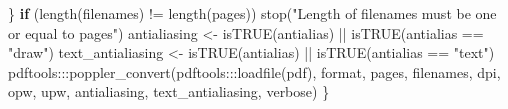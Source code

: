 \documentclass[
]{article}
\newenvironment{Shaded}{\begin{snugshade}}{\end{snugshade}}
\newcommand{\ControlFlowTok}[1]{\textcolor[rgb]{0.13,0.29,0.53}{\textbf{#1}}}
\newcommand{\FunctionTok}[1]{\textcolor[rgb]{0.00,0.00,0.00}{#1}}
\newcommand{\NormalTok}[1]{#1}
\newcommand{\OtherTok}[1]{\textcolor[rgb]{0.56,0.35,0.01}{#1}}
\newcommand{\SpecialCharTok}[1]{\textcolor[rgb]{0.00,0.00,0.00}{#1}}
\newcommand{\StringTok}[1]{\textcolor[rgb]{0.31,0.60,0.02}{#1}}
\begin{document}
\begin{Shaded}
\begin{Highlighting}[]
\NormalTok{  \}}
  \ControlFlowTok{if}\NormalTok{ (}\FunctionTok{length}\NormalTok{(filenames) }\SpecialCharTok{!=} \FunctionTok{length}\NormalTok{(pages)) }
    \FunctionTok{stop}\NormalTok{(}\StringTok{"Length of \textquotesingle{}filenames\textquotesingle{} must be one or equal to \textquotesingle{}pages\textquotesingle{}"}\NormalTok{)}
\NormalTok{  antialiasing }\OtherTok{\textless{}{-}} \FunctionTok{isTRUE}\NormalTok{(antialias) }\SpecialCharTok{||} \FunctionTok{isTRUE}\NormalTok{(antialias }\SpecialCharTok{==} 
    \StringTok{"draw"}\NormalTok{)}
\NormalTok{  text\_antialiasing }\OtherTok{\textless{}{-}} \FunctionTok{isTRUE}\NormalTok{(antialias) }\SpecialCharTok{||} \FunctionTok{isTRUE}\NormalTok{(antialias }\SpecialCharTok{==} 
    \StringTok{"text"}\NormalTok{)}
\NormalTok{  pdftools}\SpecialCharTok{:::}\FunctionTok{poppler\_convert}\NormalTok{(pdftools}\SpecialCharTok{:::}\FunctionTok{loadfile}\NormalTok{(pdf), format, pages, filenames, }
\NormalTok{    dpi, opw, upw, antialiasing, text\_antialiasing, verbose)}
\NormalTok{\}}
\end{Highlighting}
\end{Shaded}
\end{document}
